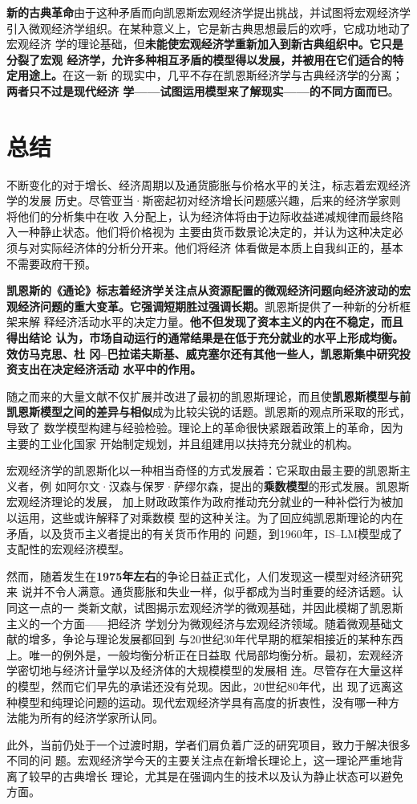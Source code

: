 \textbf{新的古典革命}由于这种矛盾而向凯恩斯宏观经济学提出挑战，并试图将宏观经济学
引入微观经济学组织。在某种意义上，它是新古典思想最后的欢呼，它成功地动了宏观经济
学的理论基础，但\textbf{未能使宏观经济学重新加入到新古典组织中。它只是分裂了宏观
  经济学，允许多种相互矛盾的模型得以发展，并被用在它们适合的特定用途上。}在这一新
的现实中，几平不存在凯恩斯经济学与古典经济学的分离；\textbf{两者只不过是现代经济
  学——试图运用模型来了解现实——的不同方面而已}。
\clearpage
\section{总结}

不断变化的对于增长、经济周期以及通货膨胀与价格水平的关注，标志着宏观经济学的发展
历史。尽管亚当·斯密起初对经济增长问题感兴趣，后来的经济学家则将他们的分析集中在收
入分配上，认为经济体将由于边际收益递减规律而最终陷入一种静止状态。他们将价格视为
主要由货币数景论决定的，并认为这种决定必须与对实际经济体的分析分开来。他们将经济
体看做是本质上自我纠正的，基本不需要政府干预。

\textbf{凯恩斯的《通论》标志着经济学关注点从资源配置的微观经济问题向经济波动的宏
  观经济问题的重大变革。它强调短期胜过强调长期。}凯恩斯提供了一种新的分析框架来解
释经济活动水平的决定力量。\textbf{他不但发现了资本主义的内在不稳定，而且得出结论
  认为，市场自动运行的通常结果是在低于充分就业的水平上形成均衡。效仿马克思、杜
  冈--巴拉诺夫斯基、威克塞尔还有其他一些人，凯恩斯集中研究投资支出在决定经济活动
  水平中的作用。}

随之而来的大量文献不仅扩展并改进了最初的凯恩斯理论，而且使\textbf{凯恩斯模型与前
  凯恩斯模型之间的差异与相似}成为比较尖锐的话题。凯恩斯的观点所采取的形式，导致了
数学模型构建与经验检验。理论上的革命很快紧跟着政策上的革命，因为主要的工业化国家
开始制定规划，并且组建用以扶持充分就业的机构。

宏观经济学的凯恩斯化以一种相当奇怪的方式发展着：它采取由最主要的凯恩斯主义者，例
如阿尔文·汉森与保罗·萨缪尔森，提出的\textbf{乘数模型}的形式发展。凯恩斯宏观经济理论的发展，
加上财政政策作为政府推动充分就业的一种补偿行为被加以运用，这些或许解释了对乘数模
型的这种关注。为了回应纯凯恩斯理论的内在矛盾，以及货币主义者提出的有关货币作用的
问题，到1960年，IS--LM模型成了支配性的宏观经济模型。

然而，随着发生在\textbf{1975年左右}的争论日益正式化，人们发现这一模型对经济研究来
说并不令人满意。通货膨胀和失业一样，似乎都成为当时重要的经济话题。认同这一点的一
类新文献，试图揭示宏观经济学的微观基础，并因此模糊了凯恩斯主义的一个方面——把经济
学划分为微观经济与宏观经济领域。随着微观基础文献的增多，争论与理论发展都回到
与20世纪30年代早期的框架相接近的某种东西上。唯一的例外是，一般均衡分析正在日益取
代局部均衡分析。最初，宏观经济学密切地与经济计量学以及经济体的大规模模型的发展相
连。尽管存在大量这样的模型，然而它们早先的承诺还没有兑现。因此，20世纪80年代，出
现了远离这种模型和纯理论问题的运动。现代宏观经济学具有高度的折衷性，没有哪一种方
法能为所有的经济学家所认同。

此外，当前仍处于一个过渡时期，学者们肩负着广泛的研究项目，致力于解决很多不同的问
题。宏观经济学今天的主要关注点在新增长理论上，这一理论严重地背离了较早的古典增长
理论，尤其是在强调内生的技术以及认为静止状态可以避免方面。



